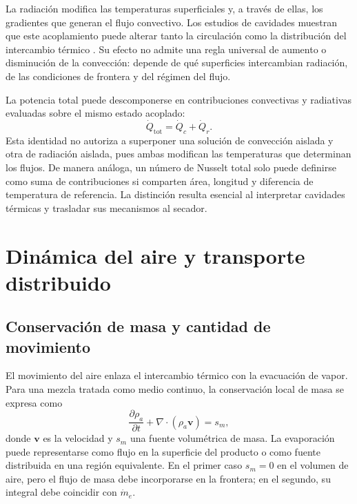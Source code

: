 La radiación modifica las temperaturas superficiales y, a través de ellas, los gradientes que generan el flujo convectivo. Los estudios de cavidades muestran que este acoplamiento puede alterar tanto la circulación como la distribución del intercambio térmico \cite{balaji1993}. Su efecto no admite una regla universal de aumento o disminución de la convección: depende de qué superficies intercambian radiación, de las condiciones de frontera y del régimen del flujo.

La potencia total puede descomponerse en contribuciones convectivas y radiativas evaluadas sobre el mismo estado acoplado:
\begin{equation}
\dot Q_{\mathrm{tot}}=\dot Q_c+\dot Q_r.
\label{eq:qtotal}
\end{equation}
Esta identidad no autoriza a superponer una solución de convección aislada y otra de radiación aislada, pues ambas modifican las temperaturas que determinan los flujos. De manera análoga, un número de Nusselt total solo puede definirse como suma de contribuciones si comparten área, longitud y diferencia de temperatura de referencia. La distinción resulta esencial al interpretar cavidades térmicas y trasladar sus mecanismos al secador.

\section{Dinámica del aire y transporte distribuido}
\label{sec:dinamica_aire}

\subsection{Conservación de masa y cantidad de movimiento}

El movimiento del aire enlaza el intercambio térmico con la evacuación de vapor. Para una mezcla tratada como medio continuo, la conservación local de masa se expresa como
\begin{equation}
\frac{\partial\rho_a}{\partial t}
+\nabla\cdot(\rho_a\mathbf v)=s_m,
\label{eq:continuidad}
\end{equation}
donde $\mathbf v$ es la velocidad y $s_m$ una fuente volumétrica de masa. La evaporación puede representarse como flujo en la superficie del producto o como fuente distribuida en una región equivalente. En el primer caso $s_m=0$ en el volumen de aire, pero el flujo de masa debe incorporarse en la frontera; en el segundo, su integral debe coincidir con $\dot m_e$.

